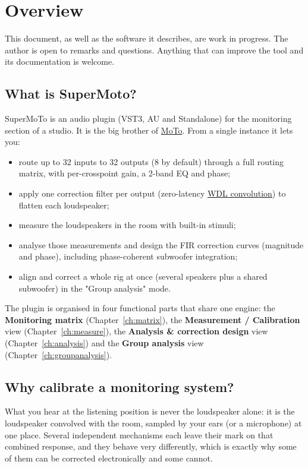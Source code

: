 \chapter{Overview}

This document, as well as the software it describes, are work in progress. The author is open to remarks and questions. Anything that can improve the tool and its documentation is welcome.

\section{What is SuperMoto?}
SuperMoTo is an audio plugin (VST3, AU and Standalone) for the
monitoring section of a studio. It is the big brother of
\href{https://github.com/odoare/MoTo}{MoTo}. From a single instance it lets you:

\begin{itemize}[nosep]
  \item route up to 32 inputs to 32 outputs (8 by default) through a
        full routing matrix, with per-crosspoint gain, a 2-band EQ and phase;
  \item apply one  correction filter per output (zero-latency \href{https://www.cockos.com/wdl/}{WDL
        convolution}) to flatten each loudspeaker;
  \item measure the loudspeakers in the room with built-in stimuli;
  \item analyse those measurements and design the FIR
        correction curves (magnitude and phase), including phase-coherent
        subwoofer integration;
  \item align and correct a whole rig at once (several speakers
        plus a shared subwoofer) in the "Group analysis" mode.
\end{itemize}

The plugin is organised in four functional parts that share one engine:
the \textbf{Monitoring matrix} (Chapter~\ref{ch:matrix}), the
\textbf{Measurement / Calibration} view (Chapter~\ref{ch:measure}), the
\textbf{Analysis \& correction design} view (Chapter~\ref{ch:analysis}) and
the \textbf{Group analysis} view (Chapter~\ref{ch:groupanalysis}).

\section{Why calibrate a monitoring system?}\label{sec:why}
What you hear at the listening position is never the loudspeaker alone: it is the loudspeaker convolved with the room, sampled by your ears (or a microphone) at one place. Several independent mechanisms each leave their mark on that combined response, and they behave very differently, which is exactly why some of them can be corrected electronically and some cannot.


